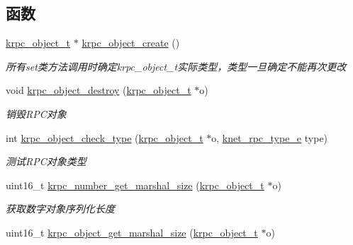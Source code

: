 \subsection*{函数}
\begin{DoxyCompactItemize}
\item 
\hyperlink{a00053_a9c07dfc8c3b965f75b09f82fdb1bbb1e_a9c07dfc8c3b965f75b09f82fdb1bbb1e}{krpc\+\_\+object\+\_\+t} $\ast$ \hyperlink{a00110_ga6aad58d8460944596e39822181bf4848_ga6aad58d8460944596e39822181bf4848}{krpc\+\_\+object\+\_\+create} ()
\begin{DoxyCompactList}\small\item\em 所有set类方法调用时确定krpc\+\_\+object\+\_\+t实际类型，类型一旦确定不能再次更改 \end{DoxyCompactList}\item 
void \hyperlink{a00110_ga8bb578f8ba5a8de682a1fe2a4c8a20f6_ga8bb578f8ba5a8de682a1fe2a4c8a20f6}{krpc\+\_\+object\+\_\+destroy} (\hyperlink{a00053_a9c07dfc8c3b965f75b09f82fdb1bbb1e_a9c07dfc8c3b965f75b09f82fdb1bbb1e}{krpc\+\_\+object\+\_\+t} $\ast$o)
\begin{DoxyCompactList}\small\item\em 销毁\+R\+P\+C对象 \end{DoxyCompactList}\item 
int \hyperlink{a00110_gac0a05f116ee7164ceebf6f7fabcf46cf_gac0a05f116ee7164ceebf6f7fabcf46cf}{krpc\+\_\+object\+\_\+check\+\_\+type} (\hyperlink{a00053_a9c07dfc8c3b965f75b09f82fdb1bbb1e_a9c07dfc8c3b965f75b09f82fdb1bbb1e}{krpc\+\_\+object\+\_\+t} $\ast$o, \hyperlink{a00053_a6fe1ebc0ddea56dd3c337115c1e10bc4_a6fe1ebc0ddea56dd3c337115c1e10bc4}{knet\+\_\+rpc\+\_\+type\+\_\+e} type)
\begin{DoxyCompactList}\small\item\em 测试\+R\+P\+C对象类型 \end{DoxyCompactList}\item 
uint16\+\_\+t \hyperlink{a00091_aaa8a155df38de3bbf2a876b94686d195_aaa8a155df38de3bbf2a876b94686d195}{krpc\+\_\+number\+\_\+get\+\_\+marshal\+\_\+size} (\hyperlink{a00053_a9c07dfc8c3b965f75b09f82fdb1bbb1e_a9c07dfc8c3b965f75b09f82fdb1bbb1e}{krpc\+\_\+object\+\_\+t} $\ast$o)
\begin{DoxyCompactList}\small\item\em 获取数字对象序列化长度 \end{DoxyCompactList}\item 
uint16\+\_\+t \hyperlink{a00110_gad51ebf7392be0ee1fd9597aa22a43015_gad51ebf7392be0ee1fd9597aa22a43015}{krpc\+\_\+object\+\_\+get\+\_\+marshal\+\_\+size} (\hyperlink{a00053_a9c07dfc8c3b965f75b09f82fdb1bbb1e_a9c07dfc8c3b965f75b09f82fdb1bbb1e}{krpc\+\_\+object\+\_\+t} $\ast$o)

\end{DoxyCompactItemize}
